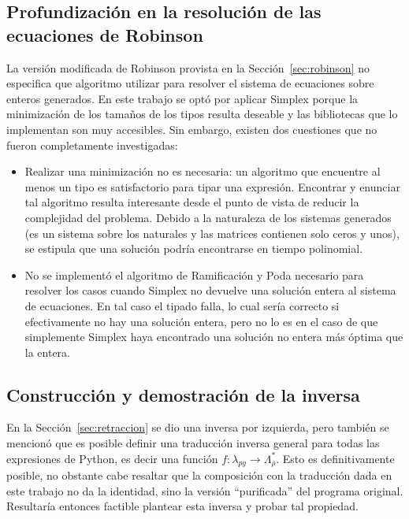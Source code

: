 \subsection{Profundización en la resolución de las ecuaciones de Robinson}\label{sec:simplex_future}

La versión modificada de Robinson provista en la Sección~\ref{sec:robinson} no especifica que algoritmo utilizar para resolver el sistema de ecuaciones sobre enteros generados. En este trabajo se optó por aplicar Simplex porque la minimización de los tamaños de los tipos resulta deseable y las bibliotecas que lo implementan son muy accesibles. Sin embargo, existen dos cuestiones que no fueron completamente investigadas:
\begin{itemize}
    \item Realizar una minimización no es necesaria: un algoritmo que encuentre al menos un tipo es satisfactorio para tipar una expresión. Encontrar y enunciar tal algoritmo resulta interesante desde el punto de vista de reducir la complejidad del problema. Debido a la naturaleza de los sistemas generados (es un sistema sobre los naturales y las matrices contienen solo ceros y unos), se estipula que una solución podría encontrarse en tiempo polinomial.
    \item No se implementó el algoritmo de Ramificación y Poda necesario para resolver los casos cuando Simplex no devuelve una solución entera al sistema de ecuaciones. En tal caso el tipado falla, lo cual sería correcto si efectivamente no hay una solución entera, pero no lo es en el caso de que simplemente Simplex haya encontrado una solución no entera más óptima que la entera.
\end{itemize}


\subsection{Construcción y demostración de la inversa}\label{sub:inversa_futuro}

En la Sección~\ref{sec:retraccion} se dio una inversa por izquierda, pero también se mencionó que es posible definir una traducción inversa general para todas las expresiones de Python, es decir una función $f: \lambda_\textit{py} \rightarrow \Lambda_\rho^*$. Esto es definitivamente posible, no obstante cabe resaltar que la composición con la traducción dada en este trabajo no da la identidad, sino la versión ``purificada'' del programa original. Resultaría entonces factible plantear esta inversa y probar tal propiedad.
